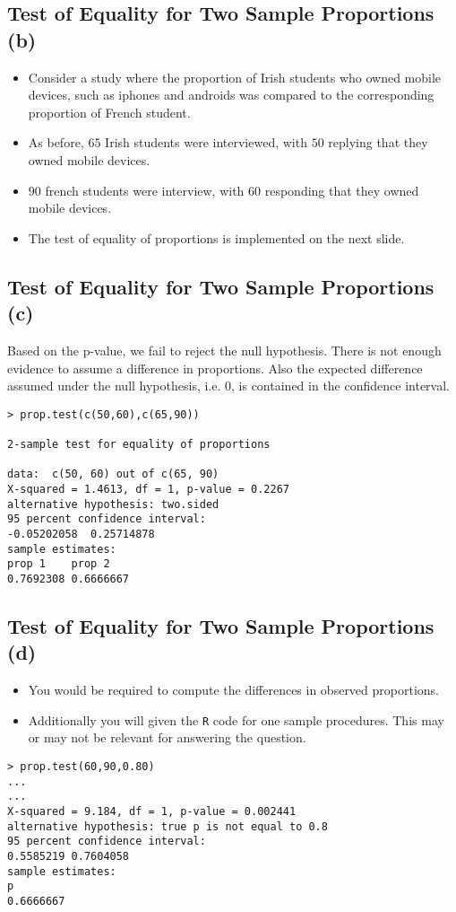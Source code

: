 \documentclass[]{report}
\begin{document}

\subsection{Test of Equality for Two Sample Proportions (b)}
\begin{itemize}
	\item Consider a study where the proportion of Irish students who owned mobile devices, such as iphones and androids was compared to the corresponding proportion of French student.
	\item As before, $65$ Irish students were interviewed, with $50$ replying that they owned mobile devices.
	\item $90$ french students were interview, with 60 responding that they owned mobile devices.
	\item The test of equality of proportions is implemented on the next slide.
\end{itemize}





\subsection{Test of Equality for Two Sample Proportions (c)}
Based on the p-value, we fail to reject the null hypothesis. There is not enough evidence to assume a difference in proportions. Also the expected difference assumed under the null hypothesis, i.e. 0, is contained in the confidence interval.
\begin{verbatim}
> prop.test(c(50,60),c(65,90))

2-sample test for equality of proportions

data:  c(50, 60) out of c(65, 90)
X-squared = 1.4613, df = 1, p-value = 0.2267
alternative hypothesis: two.sided
95 percent confidence interval:
-0.05202058  0.25714878
sample estimates:
prop 1    prop 2
0.7692308 0.6666667
\end{verbatim}


\subsection{Test of Equality for Two Sample Proportions (d)}
\begin{itemize}
	\item You would be required to compute the differences in observed proportions.
	\item Additionally you will given the \texttt{R} code for one sample procedures. This may or may not be relevant for answering the question.
\end{itemize}
\begin{verbatim}
> prop.test(60,90,0.80)
...
...
X-squared = 9.184, df = 1, p-value = 0.002441
alternative hypothesis: true p is not equal to 0.8
95 percent confidence interval:
0.5585219 0.7604058
sample estimates:
p
0.6666667
\end{verbatim}	
\end{document}
